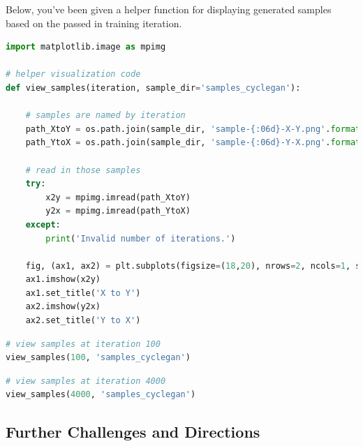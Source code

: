 Below, you've been given a helper function for displaying generated
samples based on the passed in training iteration.

\begin{lstlisting}[language=Python]
import matplotlib.image as mpimg

# helper visualization code
def view_samples(iteration, sample_dir='samples_cyclegan'):
    
    # samples are named by iteration
    path_XtoY = os.path.join(sample_dir, 'sample-{:06d}-X-Y.png'.format(iteration))
    path_YtoX = os.path.join(sample_dir, 'sample-{:06d}-Y-X.png'.format(iteration))
    
    # read in those samples
    try: 
        x2y = mpimg.imread(path_XtoY)
        y2x = mpimg.imread(path_YtoX)
    except:
        print('Invalid number of iterations.')
    
    fig, (ax1, ax2) = plt.subplots(figsize=(18,20), nrows=2, ncols=1, sharey=True, sharex=True)
    ax1.imshow(x2y)
    ax1.set_title('X to Y')
    ax2.imshow(y2x)
    ax2.set_title('Y to X')
\end{lstlisting}

\begin{lstlisting}[language=Python]
# view samples at iteration 100
view_samples(100, 'samples_cyclegan')
\end{lstlisting}

\begin{lstlisting}[language=Python]
# view samples at iteration 4000
view_samples(4000, 'samples_cyclegan')
\end{lstlisting}

\subsection{Further Challenges and Directions}

